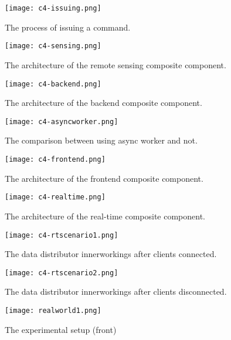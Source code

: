 \documentclass[../thesis.tex]{subfiles}
\begin{document}
\begin{figure}[!ht]
\centering
\texttt{[image: c4-issuing.png]}
\caption{The process of issuing a command.}
\label{fig:issuing}
\end{figure}

\begin{figure}[!ht]
\centering
\texttt{[image: c4-sensing.png]}
\caption{The architecture of the remote sensing composite component.}
\label{fig:sensing}
\end{figure}

\begin{figure}[!ht]
\centering
\texttt{[image: c4-backend.png]}
\caption{The architecture of the backend composite component.}
\label{fig:backend}
\end{figure}

\begin{figure}[!ht]
\centering
\texttt{[image: c4-asyncworker.png]}
\caption{The comparison between using async worker and not.}
\label{fig:asyncworker}
\end{figure}

\begin{figure}[!ht]
\centering
\texttt{[image: c4-frontend.png]}
\caption{The architecture of the frontend composite component.}
\label{fig:frontend}
\end{figure}

\begin{figure}[!ht]
\centering
\texttt{[image: c4-realtime.png]}
\caption{The architecture of the real-time composite component.}
\label{fig:realtime}
\end{figure}

\begin{figure}[!ht]
\centering
\texttt{[image: c4-rtscenario1.png]}
\caption{The data distributor innerworkings after clients connected.}
\label{fig:rtscenario1}
\end{figure}

\begin{figure}[!ht]
\centering
\texttt{[image: c4-rtscenario2.png]}
\caption{The data distributor innerworkings after clients disconnected.}
\label{fig:rtscenario2}
\end{figure}

\begin{figure}[!ht]
\centering
\texttt{[image: realworld1.png]}
\caption{The experimental setup (front)}
\label{fig:realworld1}
\end{figure}
\end{document}
